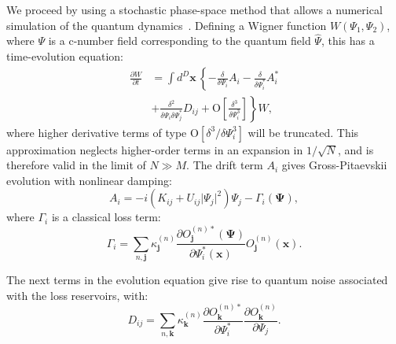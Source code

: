 \documentclass[aps,prl,twocolumn,showpacs,amsmath,amssymb,superscriptaddress]{revtex4-1}
\newcommand{\petersremark}[1]{\textcolor{cyan}{{[}PD: #1{]}}}
\newcommand{\xvec}{\boldsymbol{x}}
\newcommand{\jvec}{\boldsymbol{j}}
\newcommand{\kvec}{\boldsymbol{k}}
\newcommand{\Psivec}{\boldsymbol{\Psi}}
\begin{document}
We proceed by using a stochastic phase-space method
that allows a numerical simulation of the quantum dynamics~\cite{Drummond1993,Steel1998,Hoffmann2008}.
Defining a Wigner function $W\left(\Psi_{1},\Psi_{2}\right)$,
where $\Psi$ is a c-number field corresponding to the quantum field $\hat{\Psi}$,
this has a time-evolution equation:
\begin{equation}
\begin{split}
	\frac{\partial W}{\partial t} & = \int d^D \xvec \,\left\{
		-\frac{\delta}{\delta\Psi_{i}} A_{i} -
		\frac{\delta}{\delta\Psi_{i}^*} A_{i}^* \right. \\
& + \left. \frac{\delta^{2}}{\delta\Psi_{i} \delta\Psi_{j}^{*}}D_{ij} +
		\mbox{O} \left[ \frac{\delta^{3}}{\delta\Psi_{i}^{3}} \right]
	\right\} W,
\end{split}
\end{equation}
where higher derivative terms of type $\mbox{O}\left[\delta^3/\delta\Psi_{i}^{3}\right]$
will be truncated.
This approximation neglects higher-order terms in an expansion in $1/\sqrt{N}$,
and is therefore valid in the limit of $N \gg M$.
The drift term $A_{i}$ gives Gross-Pitaevskii evolution with nonlinear damping:
\begin{equation}
	A_{i} = -i \left( K_{ij} + U_{ij} \lvert \Psi_{j} \rvert^{2} \right) \Psi_{j} -
	\Gamma_{i} \left( \Psivec \right),
\end{equation}
where $\Gamma_{i}$ is a classical loss term:
\begin{equation}
	\Gamma_{i} = \sum_{n,\jvec} \kappa_{\jvec}^{(n)}
	\frac{
		\partial O_{\jvec}^{(n)*} \left( \Psivec \right)
	}{
		\partial \Psi_{i}^* \left( \xvec \right)
	}
	O_{\jvec}^{(n)} \left( \xvec \right).
\end{equation}

The next terms in the evolution equation give rise to
quantum noise associated with the loss reservoirs,
with:
\begin{equation}
	D_{ij} = \sum_{n,\kvec} \kappa_{\kvec}^{(n)}
	\frac{\partial O_{\kvec}^{(n)*}}{\partial\Psi_{i}^{*}}
	\frac{\partial O_{\kvec}^{(n)}}{\partial\Psi_{j}}.
\end{equation}
\end{document}
